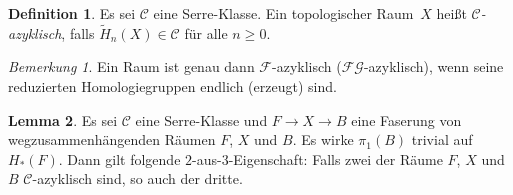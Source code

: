 \documentclass[11pt, a4paper, german]{article}
\theoremstyle{definition}
\newtheorem{lem}{Lemma}
\newtheorem{defn}[lem]{Definition}
\theoremstyle{remark}
\newtheorem*{bem}{Bemerkung}
\newcommand{\SC}{\mathcal{C}} %
\newcommand{\FG}{\mathcal{FG}} %
\newcommand{\F}{\mathcal{F}} %
\begin{document}
\begin{defn}
  Es sei $\SC$ eine Serre-Klasse.
  Ein topologischer Raum~$X$ heißt \emph{$\SC$-azyklisch}, falls $\widetilde{H}_n(X) \in \SC$ für alle $n \geq 0$.
\end{defn}

\begin{bem}
  Ein Raum ist genau dann $\F$-azyklisch ($\FG$-azyklisch), wenn seine reduzierten Homologiegruppen endlich (erzeugt) sind.
\end{bem}

\begin{lem}\label{two-of-three}
  Es sei $\SC$ eine Serre-Klasse und $F \to X \to B$ eine Faserung von wegzusammenhängenden Räumen $F$, $X$ und $B$.
  Es wirke $\pi_1(B)$ trivial auf $H_*(F)$.
  Dann gilt folgende $2$-aus-$3$-Eigenschaft: Falls zwei der Räume $F$, $X$ und $B$ $\SC$-azyklisch sind, so auch der dritte.
\end{lem}
\end{document}
